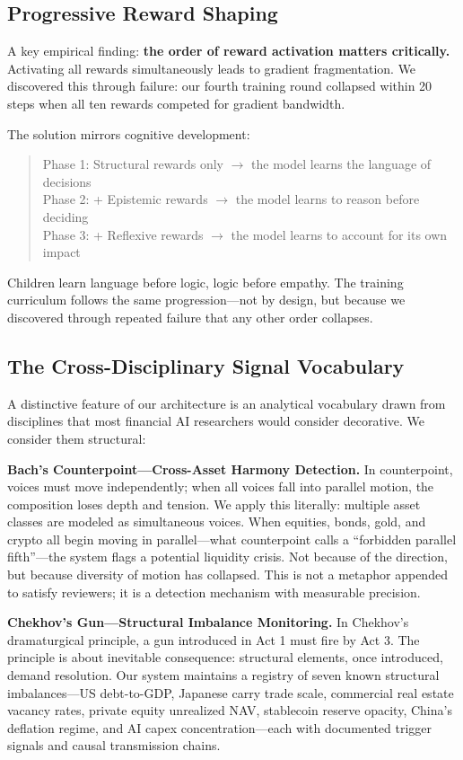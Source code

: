 \documentclass[11pt,a4paper]{article}
\begin{document}
\subsection{Progressive Reward Shaping}

A key empirical finding: \textbf{the order of reward activation matters critically.} Activating all rewards simultaneously leads to gradient fragmentation. We discovered this through failure: our fourth training round collapsed within 20 steps when all ten rewards competed for gradient bandwidth.

The solution mirrors cognitive development:

\begin{quote}
Phase 1: Structural rewards only $\to$ the model learns the language of decisions\\
Phase 2: + Epistemic rewards $\to$ the model learns to reason before deciding\\
Phase 3: + Reflexive rewards $\to$ the model learns to account for its own impact
\end{quote}

Children learn language before logic, logic before empathy. The training curriculum follows the same progression---not by design, but because we discovered through repeated failure that any other order collapses.

\subsection{The Cross-Disciplinary Signal Vocabulary}

A distinctive feature of our architecture is an analytical vocabulary drawn from disciplines that most financial AI researchers would consider decorative. We consider them structural:

\textbf{Bach's Counterpoint---Cross-Asset Harmony Detection.} In counterpoint, voices must move independently; when all voices fall into parallel motion, the composition loses depth and tension. We apply this literally: multiple asset classes are modeled as simultaneous voices. When equities, bonds, gold, and crypto all begin moving in parallel---what counterpoint calls a ``forbidden parallel fifth''---the system flags a potential liquidity crisis. Not because of the direction, but because diversity of motion has collapsed. This is not a metaphor appended to satisfy reviewers; it is a detection mechanism with measurable precision.

\textbf{Chekhov's Gun---Structural Imbalance Monitoring.} In Chekhov's dramaturgical principle, a gun introduced in Act 1 must fire by Act 3. The principle is about inevitable consequence: structural elements, once introduced, demand resolution. Our system maintains a registry of seven known structural imbalances---US debt-to-GDP, Japanese carry trade scale, commercial real estate vacancy rates, private equity unrealized NAV, stablecoin reserve opacity, China's deflation regime, and AI capex concentration---each with documented trigger signals and causal transmission chains.
\end{document}
